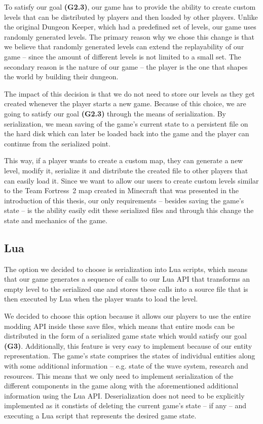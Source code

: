 To satisfy our goal \textbf{(G2.3)}, our game has to provide the ability to create custom levels that can be distributed by
players and then loaded by other players. Unlike the original Dungeon Keeper, which had a predefined set of levels, our game uses
randomly generated levels. The primary reason why we chose this change is that we believe that randomly generated levels can extend the
replayability of our game -- since the amount of different levels is not limited to a small set. The secondary reason is the nature of
our game -- the player is the one that shapes the world by building their dungeon.

The impact of this decision is that we do not need to store our levels as they get created whenever the player starts a new game. 
Because of this choice, we are going to satisfy our goal \textbf{(G2.3)} through the means of serialization. By serialization, we mean
saving of the game's current state to a persistent file on the hard disk which can later be loaded back into the game and the player
can continue from the serialized point.

This way, if a player wants to create a custom map, they can generate a new level, modify it, serialize it and distribute the created
file to other players that can easily load it. Since we want to allow our users to create custom levels similar to the Team Fortress~2
map created in Minecraft that was presented in the introduction of this thesis, our only requirements -- besides saving the game's state --
is the ability easily edit these serialized files and through this change the state and mechanics of the game.

\subsection{Lua}

The option we decided to choose is serialization into Lua scripts, which means that our game generates a sequence of calls to our Lua
API that transforms an empty level to the serialized one and stores these calls into a source file that is then executed by Lua when
the player wants to load the level.

We decided to choose this option because it allows our players to use the entire modding API inside these save files, which means that
entire mods can be distributed in the form of a serialized game state which would satisfy our goal \textbf{(G3)}.
Additionally, this feature is very easy to implement because of our
entity representation. The game's state comprises the states of individual entities along with some additional information -- e.g.
state of the wave system, research and resources. This means that we only need to implement serialization of the different
components in the game along with the aforementioned additional information using the Lua API. Deserialization does not need to be explicitly
implemented as it constists of deleting the current game's state -- if any -- and executing a Lua script that represents the desired
game state.

